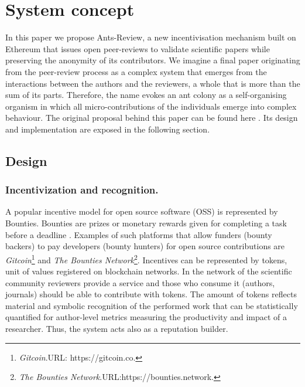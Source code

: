 \documentclass[runningheads]{llncs}
\begin{document}
\section{System concept}
In this paper we propose Ants-Review, a new incentivisation mechanism built on Ethereum that issues open peer-reviews to validate scientific papers while preserving the anonymity of its contributors. We imagine a final paper originating from the peer-review process as a complex system that emerges from the interactions between the authors and the reviewers, a whole that is more than the sum of its parts. Therefore, the name evokes an ant colony as a self-organising organism in which all micro-contributions of the individuals emerge into complex behaviour.
\newline The original proposal behind this paper can be found here \cite{AntsReview}.
\newline Its design and implementation are exposed in the following section.

\subsection{Design}

\subsubsection{Incentivization and recognition.} A popular incentive model for open source software (OSS) is represented by Bounties. Bounties are prizes or monetary rewards given for completing a task before a deadline \cite{BountyGit}. Examples of such platforms that allow funders (bounty backers) to pay developers (bounty hunters) for open source contributions are \emph{Gitcoin}\footnote[2]{\emph{Gitcoin}.\textsc{URL:} https://gitcoin.co.} and \emph{The Bounties Network}\footnote[3]{\emph{The Bounties Network}.\textsc{URL:}https://bounties.network.}. Incentives can be represented by tokens, unit of values registered on blockchain networks.
\newline In the network of the scientific community reviewers provide a service and those who consume it (authors, journals) should be able to contribute with tokens. The amount of tokens reflects material and symbolic recognition of the performed work that can be statistically quantified for author-level metrics measuring the productivity and impact of a researcher.
Thus, the system acts also as a reputation builder.
\end{document}
